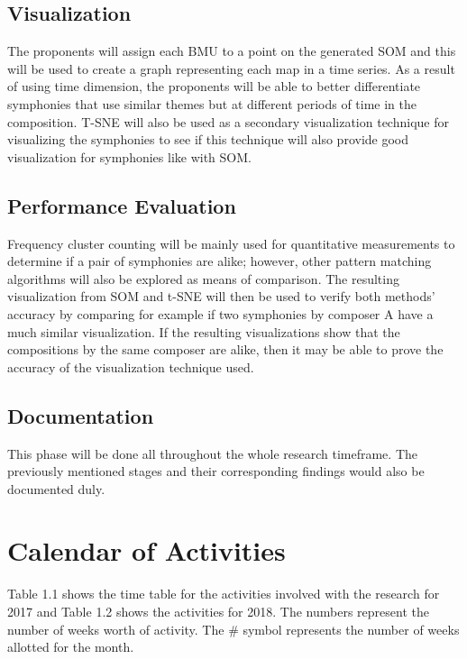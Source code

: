 \subsection{Visualization}
The proponents will assign each BMU to a point on the generated SOM and this will be used to create a graph representing each map in a time series. As a result of using time dimension,  the proponents will be able to better differentiate symphonies that use similar themes but at different periods of time in the composition. T-SNE will also be used as a secondary visualization technique for visualizing the symphonies to see if this technique will also provide good visualization for symphonies like with SOM.

\subsection{Performance Evaluation}
Frequency cluster counting will be mainly used for quantitative measurements to determine if a pair of symphonies are alike; however, other pattern matching algorithms will also be explored as means of comparison. The resulting visualization from SOM and t-SNE will then be used to verify both methods' accuracy by comparing for example if two symphonies by composer A have a much similar visualization. If the resulting visualizations show that the compositions by the same composer are alike, then it may be able to prove the accuracy of the visualization technique used.

\subsection{Documentation}
This phase will be done all throughout the whole research timeframe. The previously mentioned stages and their corresponding findings would also be documented duly.

\section{Calendar of Activities}
Table 1.1 shows the time table for the activities involved with the research for 2017 and Table 1.2 shows the activities for 2018. The numbers represent the number of weeks worth of activity. The \# symbol represents the number of weeks allotted for the month.

